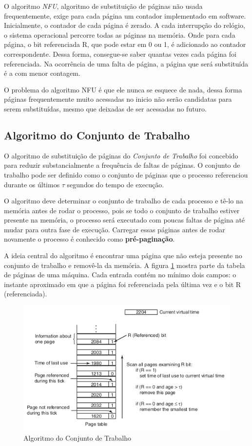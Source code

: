 O algoritmo \textit{NFU}, algoritmo de substituição de páginas não usada frequentemente, exige para cada página um contador implementado em software. Inicialmente, o contador de cada página é zerado. A cada interrupção do relógio, o sistema operacional percorre todas as páginas na memória. Onde para cada página, o bit referenciada R, que pode estar em 0 ou 1, é adicionado ao contador correspondente. Dessa forma, consegue-se saber quantas vezes cada página foi referenciada. Na ocorrência de uma falta de página, a página que será substituída é a com menor contagem.

O problema do algoritmo NFU é que ele nunca se esquece de nada, dessa forma páginas frequentemente muito acessadas no inicio não serão candidatas para serem substituídas, mesmo que deixadas de ser acessadas no futuro.

\subsection{Algoritmo do Conjunto de Trabalho}

O algoritmo de substituição de páginas do \textit{Conjunto de Trabalho} foi concebido para reduzir substancialmente a frequência de faltas de páginas. O conjunto de trabalho pode ser definido como o conjunto de páginas que o processo referenciou durante os últimos $\tau$ segundos do tempo de execução.

O algoritmo deve determinar o conjunto de trabalho de cada processo e tê-lo na memória antes de rodar o processo, pois se todo o conjunto de trabalho estiver presente na memória, o processo será executado com poucas faltas de página até mudar para outra fase de execução. Carregar essas páginas antes de rodar novamente o processo é conhecido como \textbf{pré-paginação}.

A ideia central do algoritmo é encontrar uma página que não esteja presente no conjunto de trabalho e removê-la da memória. A figura \ref{ram-ws-1} mostra parte da tabela de páginas de uma máquina. Cada entrada contém no mínimo dois campos: o instante aproximado em que a página foi referenciada pela última vez e o bit R (referenciada).

\begin{figure}
	\includegraphics[scale=0.6]{ram-ws-1.png}
    \centering
    \caption{Algoritmo do Conjunto de Trabalho}
    \label{ram-ws-1}
\end{figure}

